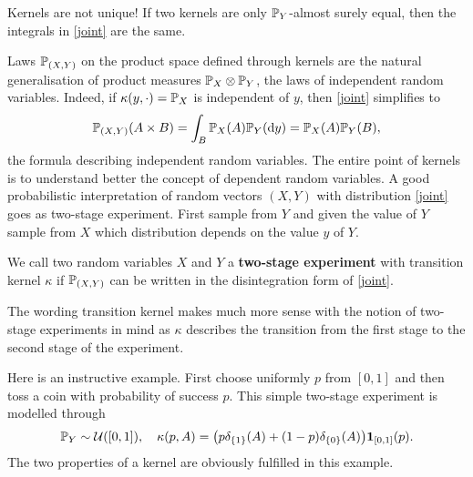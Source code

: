 	\marginpar{\textcolor{red}{Lecture 3}}
\begin{lwarnhinweis}
	Kernels are not unique! If two kernels are only $\P_Y$-almost surely equal, then the integrals in \eqref{joint} are the same. 
\end{lwarnhinweis}
Laws $\P_{(X,Y)}$ on the product space defined through kernels are the natural generalisation of product measures $\P_X\otimes \P_Y$, the laws of independent random variables. Indeed, if $\kappa(y,\cdot)=\P_X$ is independent of $y$, then \eqref{joint} simplifies to 
		\begin{align*}
			\P_{(X,Y)}(A\times B)=\int_B \P_X(A)  \P_Y(\mathrm d y)=\P_X(A) \P_Y(B),
		\end{align*}	
	the formula describing independent random variables. The entire point of kernels is to understand better the concept of dependent random variables. A good probabilistic interpretation of random vectors $(X,Y)$ with distribution \eqref{joint} goes as two-stage experiment. First sample from $Y$ and given the value of $Y$ sample from $X$ which distribution depends on the value $y$ of $Y$.
	\begin{llemma}
	\begin{deff}
		We call two random variables $X$ and $Y$ a \textbf{two-stage experiment} with transition kernel $\kappa$ if $\P_{(X,Y)}$ can be written in the disintegration form of \eqref{joint}.
	\end{deff}
	\end{llemma}
		The wording transition kernel makes much more sense with the notion of two-stage experiments in mind as $\kappa$ describes the transition from the first stage to the second stage of the experiment.\smallskip
	
	Here is an instructive example. First choose uniformly $p$ from $[0,1]$ and then toss a coin with probability of success $p$. This simple two-stage experiment is modelled through
	\begin{align*}
		\P_Y\sim \mathcal U([0,1]),\quad \kappa(p,A )= \big(p\delta_{\{1\}}(A)+(1-p)\delta_{\{0\}}(A)\big) \mathbf 1_{[0,1]}(p).
	\end{align*}
	The two properties of a kernel are obviously fulfilled in this example.\smallskip

		

